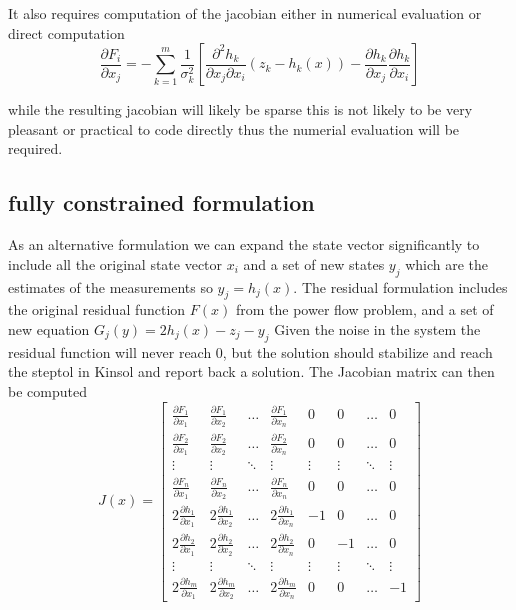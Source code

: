 \documentclass[11pt]{article} %
\newcommand{\pdiff}[2]{\frac{\partial #1}{\partial #2}}
\begin{document}
It also requires computation of the jacobian either in numerical evaluation or direct computation
\begin{equation}
\pdiff{F_i}{x_j} = -\sum_{k=1}^m\frac{1}{\sigma_k^2}\left[\frac{\partial^2 h_k}{\partial x_j \partial x_i}(z_k-h_k(x))-\pdiff{h_k}{x_j}\pdiff{h_k}{x_i}\right]
\end{equation}

while the resulting jacobian will likely be sparse this is not likely to be very pleasant or practical to code directly thus the numerial evaluation will be required.  

\subsection{fully constrained formulation}
As an alternative formulation we can expand the state vector significantly to include all the original state vector $x_i$ and a set of new states $y_j$ which are the estimates of the measurements so $y_j=h_j(x)$.  The residual formulation includes the original residual function $F(x)$ from the power flow problem, and a set of new equation $G_j(y)=2h_j(x)-z_j-y_j$
Given the noise in the system the residual function will never reach 0, but the solution should stabilize and reach the steptol in Kinsol and report back a solution.  
The Jacobian matrix can then be computed 
\begin{equation}
J(x) = \left[
\begin{matrix}
\pdiff{F_1}{x_1} & \pdiff{F_1}{x_2} & \hdots & \pdiff{F_1}{x_n} & 0 & 0 &\hdots & 0 \\
\pdiff{F_2}{x_1} & \pdiff{F_2}{x_2} & \hdots & \pdiff{F_2}{x_n} & 0 & 0 & \hdots & 0 \\
\vdots & \vdots & \ddots & \vdots & \vdots & \vdots & \ddots & \vdots \\
\pdiff{F_n}{x_1} & \pdiff{F_n}{x_2} & \hdots & \pdiff{F_n}{x_n} & 0 & 0 & \hdots & 0 \\
2\pdiff{h_1}{x_1} & 2\pdiff{h_1}{x_2} & \hdots &2 \pdiff{h_1}{x_n} & -1 & 0 &\hdots &0\\
2\pdiff{h_2}{x_1} &2 \pdiff{h_2}{x_2} & \hdots & 2\pdiff{h_2}{x_n} & 0 & -1  &\hdots &0\\
\vdots & \vdots & \ddots & \vdots &\vdots & \vdots  & \ddots & \vdots\\
2\pdiff{h_m}{x_1} &2 \pdiff{h_m}{x_2} & \hdots & 2\pdiff{h_m}{x_n} & 0 & 0 & \hdots &  -1

\end{matrix}
\right]
\end{equation}
\end{document}
